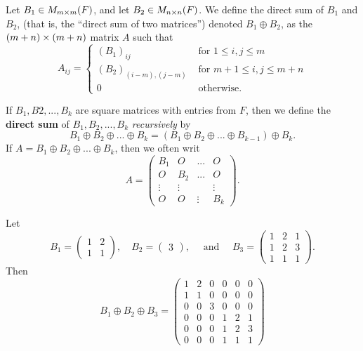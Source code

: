 \begin{definition} \label{def 5.15}
Let \(B_1 \in M_{m \times m}(F)\), and let \(B_2 \in M_{n \times n}(F)\).
We define the direct sum of \(B_1\) and \(B_2\), (that is, the ``direct sum of two matrices'') denoted \(B_1 \oplus B_2\), as the \((m + n) \times (m + n)\) matrix \(A\) such that
\begin{equation*}
    A_{ij} = \begin{cases}
        (B_1)_{ij} & \text{ for } 1 \le i, j \le m \\
        (B_2)_{(i - m), (j - m)} & \text{ for } m + 1 \le i, j \le m + n \\
        0 & \text{ otherwise. }
    \end{cases}
\end{equation*}

If \(B_1, B2, ..., B_k\) are square matrices with entries from \(F\), then we define the \textbf{direct sum} of \(B_1, B_2, ..., B_k\) \emph{recursively} by
\[
    B_1 \oplus B_2 \oplus ... \oplus B_k = (B_1 \oplus B_2 \oplus ... \oplus B_{k - 1}) \oplus B_k.
\]
If \(A = B_1 \oplus B_2 \oplus ... \oplus B_k\), then we often writ
\[
    A = \begin{pmatrix}
        B_1 & O & ... & O \\
        O   & B_2 & ... & O \\
        \vdots & \vdots & & \vdots \\
        O & O & \vdots & B_k
    \end{pmatrix}.
\]
\end{definition}

\begin{example} \label{example 5.4.9}
Let
\[
    B_1 = \begin{pmatrix} 1 & 2 \\ 1 & 1  \end{pmatrix},
    \quad B_2 = \begin{pmatrix} 3 \end{pmatrix},
    \quad \text{ and } \quad
    B_3 = \begin{pmatrix} 1 & 2 & 1 \\ 1 & 2 & 3 \\ 1 & 1 & 1 \end{pmatrix}.
\]
Then
\[
    B_1 \oplus B_2 \oplus B_3 = \begin{pmatrix}
        1 & 2 & 0 & 0 & 0 & 0 \\
        1 & 1 & 0 & 0 & 0 & 0 \\
        0 & 0 & 3 & 0 & 0 & 0 \\
        0 & 0 & 0 & 1 & 2 & 1 \\
        0 & 0 & 0 & 1 & 2 & 3 \\
        0 & 0 & 0 & 1 & 1 & 1
    \end{pmatrix}
\]
\end{example}

